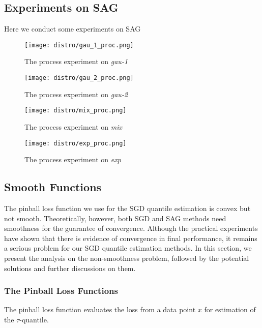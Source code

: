 \subsection{Experiments on SAG}

Here we conduct some experiments on SAG

\graphicspath{{Figures/Stepsize_adapt/SAG/}{./}} 

\begin{figure}[H]
    \centering
	\texttt{[image: distro/gau\_1\_proc.png]}
	\caption{The process experiment on \textit{gau-1}}
\end{figure}

\begin{figure}[H]
    \centering
	\texttt{[image: distro/gau\_2\_proc.png]}
	\caption{The process experiment on \textit{gau-2}}
\end{figure}

\begin{figure}[H]
    \centering
	\texttt{[image: distro/mix\_proc.png]}
	\caption{The process experiment on \textit{mix}}
\end{figure}

\begin{figure}[H]
    \centering
	\texttt{[image: distro/exp\_proc.png]}
	\caption{The process experiment on \textit{exp}}
\end{figure}

\subsection{Smooth Functions}
The pinball loss function we use for the SGD quantile estimation is convex but not smooth. 
Theoretically, however, both SGD and SAG methods need smoothness for the guarantee of convergence. Although the practical experiments have shown that there is evidence of convergence in final performance, it remains a serious problem for our SGD quantile estimation methods. In this section, we present the analysis on the non-smoothness problem, followed by the potential solutions and further discussions on them.

\subsubsection{The Pinball Loss Functions}
\graphicspath{{Figures/Stepsize_adapt/Smooth_func/}{./}} 

The pinball loss function evaluates the loss from a data point $x$ for estimation of the $\tau$-quantile.

